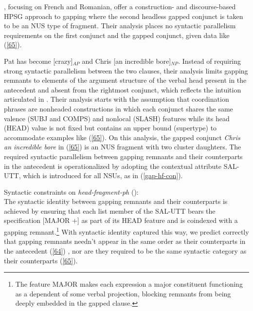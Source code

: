 {\citet{Abeille2014}, focusing on French and Romanian, offer a construction- and
discourse-based HPSG approach to gapping where the second headless gapped conjunct is taken to be an
NUS type of fragment. Their analysis places no syntactic parallelism requirements on the
first conjunct and the gapped conjunct, given data like (\ref{65}).

\ea Pat has become [crazy]$_{AP}$ and Chris [an incredible bore]$_{NP}$.  \label{65}\z
%
Instead of requiring strong syntactic parallelism between the two clauses, their analysis limits gapping remnants to elements of the argument structure of the verbal head present in the antecedent and absent from the rightmost conjunct, which reflects the intuition articulated in \citet{Hankamer1971}. Their analysis starts with the assumption that coordination phrases are nonheaded constructions in which each conjunct shares the same
valence (SUBJ and COMPS) and nonlocal (SLASH) features while
 its head (HEAD) value is not fixed but contains an upper bound (supertype) to accommodate
 examples like (\ref{65}). On this analysis, the gapped conjunct {\it Chris an incredible
  bore} in (\ref{65}) is an NUS fragment with two cluster daughters. The required
 syntactic parallelism between gapping remnants and their counterparts in the antecedent is operationalized by adopting the contextual attribute SAL-UTT, which is introduced for all NSUs, as in (\ref{gap-hf-con}).

 \ea
\label{gap-hf-con}
Syntactic constraints on {\it head-fragment-ph} (\citealt[(53)]{Abeille2014}):\\
 \impl
{}
\z
The syntactic identity between gapping remnants and their counterparts is achieved
by ensuring that each list member of the SAL-UTT bears the specification [MAJOR +] as part of its HEAD feature and is coindexed with a gapping remnant.\footnote{The feature MAJOR makes each expression a major constituent functioning as a dependent of some verbal projection, blocking
remnants from being deeply embedded in the gapped clause.}
   With syntactic identity captured this way, we predict correctly that gapping remnants needn't appear in the same order as their counterparts in the antecedent (\ref{64}) \citep[see][156--158]{Sag1985}, nor are they required to be the same syntactic category as their counterparts (\ref{65}).

}
